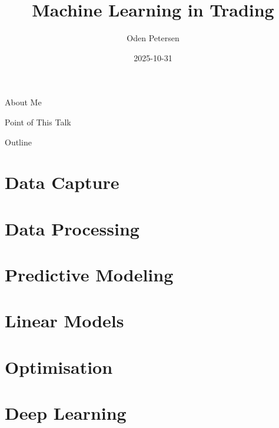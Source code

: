 \documentclass{beamer}
\title[\texttt{/trading-presentation}]{Machine Learning in Trading}
\author[\texttt{github.com/odenpetersen}]{Oden Petersen}
\date{2025-10-31}
\newcommand{\sectionquote}[1]{\def\insertsquote{#1}}
\newcommand{\insertsquote}{}
\renewcommand{\insertsquote}{}
\begin{document}
\begin{frame}
	\titlepage
\end{frame}

\begin{frame}{About Me}
\end{frame}

\begin{frame}{Point of This Talk}
	\begin{itemize}
	\end{itemize}
\end{frame}

\begin{frame}{Outline}
	\tableofcontents
\end{frame}

\sectionquote{}
\section{Data Capture}

\section{Data Processing}

\section{Predictive Modeling}

\section{Linear Models}

\section{Optimisation}


\section{Deep Learning}
\end{document}
